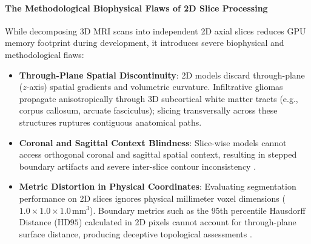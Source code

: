 \documentclass{article}
\begin{document}
\paragraph{The Methodological Biophysical Flaws of 2D Slice Processing}
While decomposing 3D MRI scans into independent 2D axial slices reduces GPU memory footprint during development, it introduces severe biophysical and methodological flaws:
\begin{itemize}
    \item \textbf{Through-Plane Spatial Discontinuity}: 2D models discard through-plane ($z$-axis) spatial gradients and volumetric curvature. Infiltrative gliomas propagate anisotropically through 3D subcortical white matter tracts (e.g., corpus callosum, arcuate fasciculus); slicing transversally across these structures ruptures contiguous anatomical paths.
    \item \textbf{Coronal and Sagittal Context Blindness}: Slice-wise models cannot access orthogonal coronal and sagittal spatial context, resulting in stepped boundary artifacts and severe inter-slice contour inconsistency \citep{isensee2021nnunet}.
    \item \textbf{Metric Distortion in Physical Coordinates}: Evaluating segmentation performance on 2D slices ignores physical millimeter voxel dimensions ($1.0 \times 1.0 \times 1.0\,\text{mm}^3$). Boundary metrics such as the 95th percentile Hausdorff Distance ($\text{HD95}$) calculated in 2D pixels cannot account for through-plane surface distance, producing deceptive topological assessments \citep{taha2015metrics}.
\end{itemize}
\end{document}

